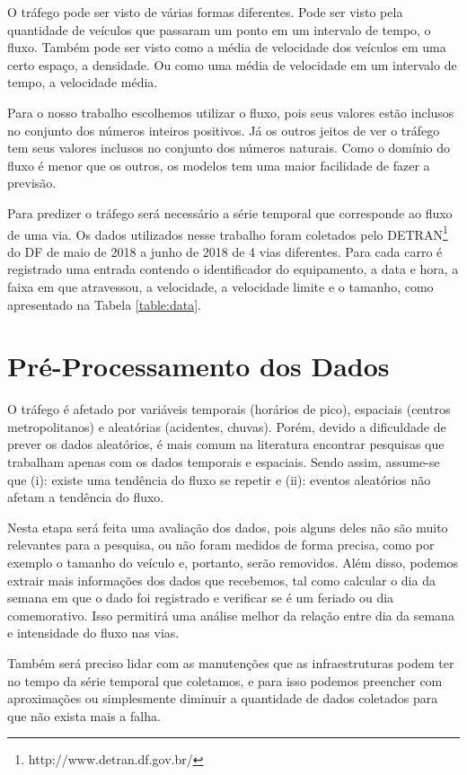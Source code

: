O tráfego pode ser visto de várias formas diferentes. Pode ser visto pela quantidade de veículos que passaram um ponto em um intervalo de tempo, o fluxo. Também pode ser visto como a média de velocidade dos veículos em uma certo espaço, a densidade. Ou como uma média de velocidade em um intervalo de tempo, a velocidade média.

Para o nosso trabalho escolhemos utilizar o fluxo, pois seus valores estão inclusos no conjunto dos números inteiros positivos. Já os outros jeitos de ver o tráfego tem seus valores inclusos no conjunto dos números naturais. Como o domínio do fluxo é menor que os outros, os modelos tem uma maior facilidade de fazer a previsão.

Para predizer o tráfego será necessário a série temporal que corresponde ao fluxo de uma via. Os dados utilizados nesse trabalho foram coletados pelo \acrfull{DETRAN}\footnote{http://www.detran.df.gov.br/} do \acrfull{DF} de maio de 2018 a junho de 2018 de 4 vias diferentes. Para cada carro é registrado uma entrada contendo o identificador do equipamento, a data e hora, a faixa em que atravessou, a velocidade, a velocidade limite e o tamanho, como apresentado na Tabela \ref{table:data}.

\section{Pré-Processamento dos Dados}

O tráfego é afetado por variáveis temporais (horários de pico), espaciais (centros metropolitanos) e aleatórias (acidentes, chuvas). Porém, devido a dificuldade de prever os dados aleatórios, é mais comum na literatura encontrar pesquisas que trabalham apenas com os dados temporais e espaciais. Sendo assim, assume-se que (i): existe uma tendência do fluxo se repetir e (ii): eventos aleatórios não afetam a tendência do fluxo.

Nesta etapa será feita uma avaliação dos dados, pois alguns deles não são muito relevantes para a pesquisa, ou não foram medidos de forma precisa, como por exemplo o tamanho do veículo e, portanto, serão removidos. Além disso, podemos extrair mais informações dos dados que recebemos, tal como calcular o dia da semana em que o dado foi registrado e verificar se é um feriado ou dia comemorativo. Isso permitirá uma análise melhor da relação entre dia da semana e intensidade do fluxo nas vias.

Também será preciso lidar com as manutenções que as infraestruturas podem ter no tempo da série temporal que coletamos, e para isso podemos preencher com aproximações ou simplesmente diminuir a quantidade de dados coletados para que não exista mais a falha.

